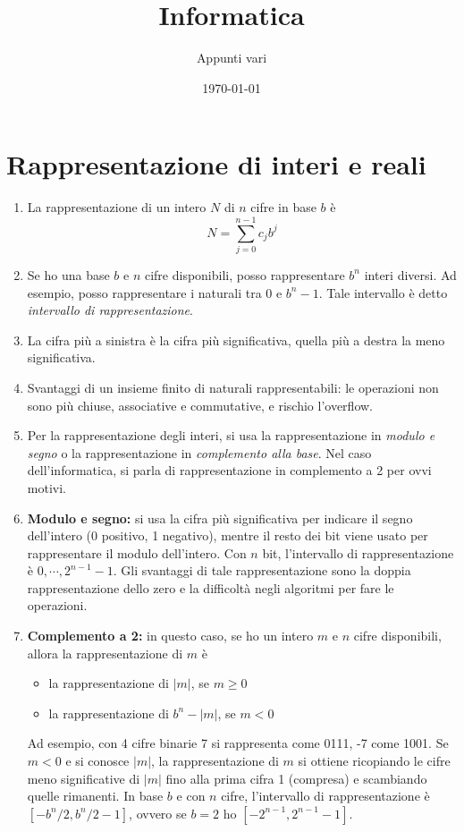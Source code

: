 \documentclass[a4paper,11pt]{article}
\title{Informatica}
\author{Appunti vari}
\date{\today}
\begin{document}
	\maketitle
	\tableofcontents
	\newpage
\section{Rappresentazione di interi e reali}
\begin{enumerate}
	\item La rappresentazione di un intero $N$ di $n$ cifre in base $b$ è
	\[N=\sum_{j=0}^{n-1}c_jb^j\]
	\item Se ho una base $b$ e $n$ cifre disponibili, posso rappresentare $b^n$ interi diversi. Ad esempio, posso rappresentare i naturali tra 0 e $b^n-1$. Tale intervallo è detto \textit{intervallo di rappresentazione}.
	\item La cifra più a sinistra è la cifra più significativa, quella più a destra la meno significativa.
	\item Svantaggi di un insieme finito di naturali rappresentabili: le operazioni non sono più chiuse, associative e commutative, e rischio l'overflow.
	\item Per la rappresentazione degli interi, si usa la rappresentazione in \textit{modulo e segno} o la rappresentazione in \textit{complemento alla base}. Nel caso dell'informatica, si parla di rappresentazione in complemento a 2 per ovvi motivi.
	\item \textbf{Modulo e segno:} si usa la cifra più significativa per indicare il segno dell'intero (0 positivo, 1 negativo), mentre il resto dei bit viene usato per rappresentare il modulo dell'intero. Con $n$ bit, l'intervallo di rappresentazione è $0,\cdots,2^{n-1}-1$.
	\noindent Gli svantaggi di tale rappresentazione sono la doppia rappresentazione dello zero e la difficoltà negli algoritmi per fare le operazioni.
	\item\textbf{Complemento a 2:} in questo caso, se ho un intero $m$ e $n$ cifre disponibili, allora la rappresentazione di $m$ è
	\begin{itemize}
		\item la rappresentazione di $|m|$, se $m\geq0$
		\item la rappresentazione di $b^n-|m|$, se $m<0$
	\end{itemize}
	Ad esempio, con 4 cifre binarie 7 si rappresenta come 0111, -7 come 1001. Se $m<0$ e si conosce $|m|$, la rappresentazione di $m$ si ottiene ricopiando le cifre meno significative di $|m|$ fino alla prima cifra 1 (compresa) e scambiando quelle rimanenti. In base $b$ e con $n$ cifre, l'intervallo di rappresentazione è $[-b^n/2,b^n/2-1]$, ovvero se $b=2$ ho $[-2^{n-1}, 2^{n-1}-1]$.

\end{enumerate}
\end{document}
